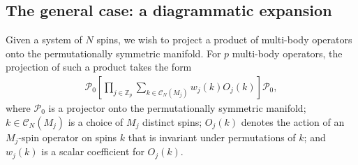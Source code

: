 \documentclass[nofootinbib,notitlepage,11pt]{revtex4-2}
\newcommand{\p}[1]{\left(#1\right)} %
\renewcommand{\sp}[1]{\left[#1\right]} %
\newcommand{\1}{\mathds{1}}
\newcommand{\C}{\mathcal{C}}
\renewcommand{\P}{\mathcal{P}}
\newcommand{\ZZ}{\mathbb{Z}}
\begin{document}
\subsection{The general case: a diagrammatic expansion}

Given a system of $N$ spins, we wish to project a product of
multi-body operators onto the permutationally symmetric manifold.  For
$p$ multi-body operators, the projection of such a product takes the
form
\begin{align}
  \P_0 \sp{\prod_{j\in\ZZ_p}
    \sum_{k\in\C_N\p{M_j}} w_j\p{k} O_j\p{k}} \P_0,
  \label{eq:sym_prod_proj}
\end{align}
where $\P_0$ is a projector onto the permutationally symmetric
manifold; $k\in\C_N\p{M_j}$ is a choice of $M_j$ distinct spins;
$O_j\p{k}$ denotes the action of an $M_j$-spin operator on spins $k$
that is invariant under permutations of $k$; and $w_j\p{k}$ is a
scalar coefficient for $O_j\p{k}$.
\end{document}
